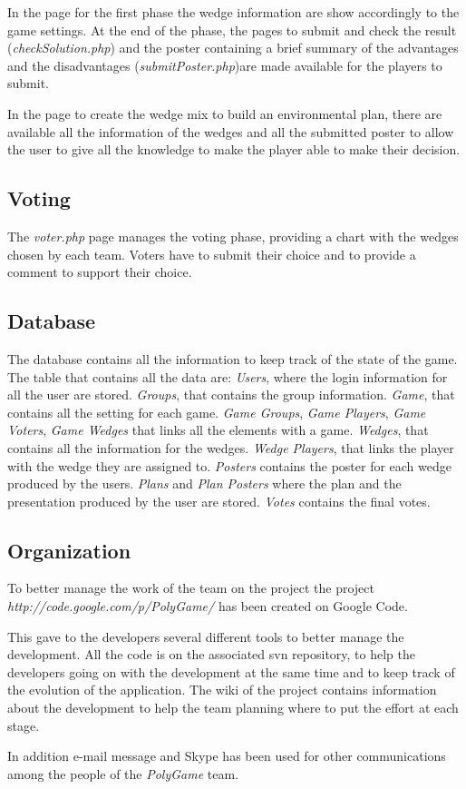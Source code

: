In the page for the first phase the wedge information are show accordingly to the game settings. At the end of the phase, the pages to submit and check the result (\emph{checkSolution.php}) and the poster containing a brief summary of the advantages and the disadvantages  (\emph{submitPoster.php})are made available for the players to submit.

In the page to create the wedge mix to build an environmental plan, there are available all the information of the wedges and all the submitted poster to allow the user to give all the knowledge to make the player able to make their decision.

\subsection{Voting}
The \emph{voter.php} page manages the voting phase, providing a chart with the wedges chosen by each team. Voters have to submit their choice and to provide a comment to support their choice.

\subsection{Database}
The database contains all the information to keep track of the state of the game.
The table that contains all the data are:
\newline
\emph{Users}, where the login information for all the user are stored.
\newline
\emph{Groups}, that contains the group information.
\newline
\emph{Game}, that contains all the setting for each game.
\newline
\emph{Game Groups}, \emph{Game Players}, \emph{Game Voters}, \emph{Game Wedges} that links all the elements with a game.
\newline
\emph{Wedges}, that contains all the information for the wedges.  \emph{Wedge Players}, that links the player with the wedge they are assigned to. \emph{Posters} contains the poster for each wedge produced by the users.
\newline
\emph{Plans} and \emph{Plan Posters} where the plan and the presentation produced by the user are stored.
\emph{Votes} contains the final votes.


\subsection{Organization}
To better manage the work of the team on the project the project \emph{http://code.google.com/p/PolyGame/} has been created on Google Code.

This gave to the developers several different tools to better manage the development.
All the code is on the associated svn repository, to help the developers going on with the development at the same time and to keep track of the evolution of the application.
The wiki of the project contains information about the development to help the team planning where to put the effort at each stage.

In addition e-mail message and Skype has been used for other communications among the people of the \emph{PolyGame} team.